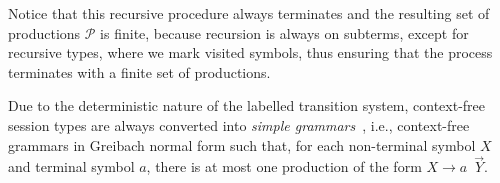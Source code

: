 
Notice that this recursive procedure always terminates and the resulting
set of productions $\mathcal{P}$ is finite, because recursion is always
on subterms, except for recursive types, where we mark visited symbols, thus
ensuring that the process terminates with a finite set of productions.

Due to the deterministic nature of the labelled transition system, context-free
session types are always converted into \emph{simple grammars}~\cite{baeten1993decidability}, i.e.,
context-free grammars in Greibach normal form such that, for each non-terminal
symbol $X$ and terminal symbol $a$, there is at most one production of the form
$X\rightarrow a \enspace \vec Y$.

